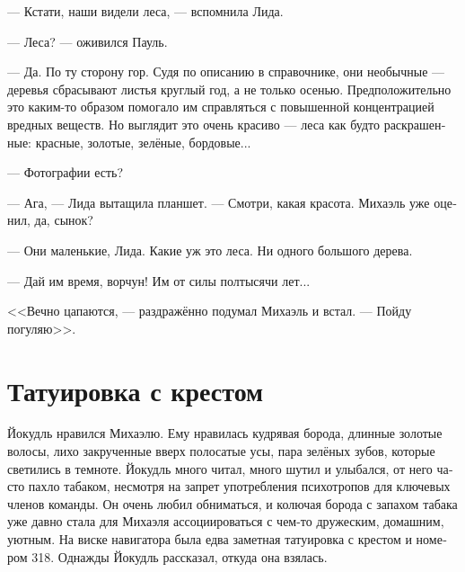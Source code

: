\documentclass[a4paper,12pt,fleqn]{book}\usepackage{cooltooltips}\usepackage{polyglossia}\setdefaultlanguage[babelshorthands=true]{russian}\setotherlanguage{english}\defaultfontfeatures{Ligatures=TeX,Mapping=tex-text} \usepackage{xcolor}\definecolor{lightgray}{HTML}{bbbbbb}\color{lightgray}\newcommand{\ml}[3]{\textenglish{\textcolor{black}{#3}}}
\begin{document}
--- Кстати, наши видели леса, --- вспомнила Лида.

--- Леса? --- оживился Пауль.

--- Да.
По ту сторону гор.
Судя по описанию в справочнике, они необычные --- деревья сбрасывают листья круглый год, а не только осенью.
Предположительно это каким-то образом помогало им справляться с повышенной концентрацией вредных веществ.
Но выглядит это очень красиво --- леса как будто раскрашенные: красные, золотые, зелёные, бордовые...

--- Фотографии есть?

--- Ага, --- Лида вытащила планшет.
--- Смотри, какая красота.
Михаэль уже оценил, да, сынок?

--- Они маленькие, Лида.
Какие уж это леса.
Ни одного большого дерева.

--- Дай им время, ворчун!
Им от силы полтысячи лет...

<<Вечно цапаются, --- раздражённо подумал Михаэль и встал.
--- Пойду погуляю>>.

\section{Татуировка с крестом}

Йокудль нравился Михаэлю.
Ему нравилась кудрявая борода, длинные золотые волосы, лихо закрученные вверх полосатые усы, пара зелёных зубов, которые светились в темноте.
Йокудль много читал, много шутил и улыбался, от него часто пахло табаком, несмотря на запрет употребления психотропов для ключевых членов команды.
Он очень любил обниматься, и колючая борода с запахом табака уже давно стала для Михаэля ассоциироваться с чем-то дружеским, домашним, уютным.
На виске навигатора была едва заметная татуировка с крестом и номером 318.
Однажды Йокудль рассказал, откуда она взялась.
\end{document}
